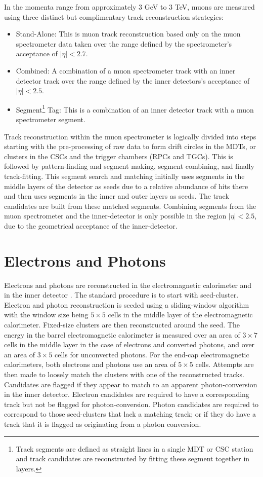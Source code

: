 In the momenta range from approximately 3 GeV to 3 TeV, muons are measured using three distinct but complimentary track reconstruction strategies:
\begin{itemize}
\item Stand-Alone: This is muon track reconstruction based only on the muon spectrometer data taken over the range defined by the spectrometer's acceptance of $| \eta | < 2.7$.
\item Combined: A combination of a muon spectrometer track with an inner detector track over the range defined by the inner detectors's acceptance of $ | \eta | < 2.5 $.
\item Segment\footnote{Track segments are defined as straight lines in a single MDT or CSC station and track candidates are reconstructed by fitting these segment together in layers.} Tag: This is a combination of an inner detector track with a muon spectrometer segment.
\end{itemize}
Track reconstruction within the muon spectrometer is logically divided into steps starting with the pre-processing of raw data to form drift circles in the MDTs, or clusters in the CSCs and the trigger chambers (RPCs and TGCs). This is followed by pattern-finding and segment making, segment combining, and finally track-fitting. This segment search and matching initially uses segments in the middle layers of the detector as seeds due to a relative abundance of hits there and then uses segments in the inner and outer layers as seeds. The track candidates are built from these matched segments. Combining segments from the muon spectrometer and the inner-detector is only possible in the region $|\eta | <2.5$, due to the geometrical acceptance of the inner-detector.
\section{Electrons and Photons}
Electrons and photons are reconstructed in the electromagnetic calorimeter and in the inner detector \cite{ATLAS}. The standard procedure is to start with seed-cluster. Electron and photon reconstruction is seeded using a sliding-window algorithm with the window size being $5 \times 5$ cells in the middle layer of the electromagnetic calorimeter. Fixed-size clusters are then reconstructed around the seed. The energy in the barrel electromagnetic calorimeter is measured over an area of $3 \times 7$ cells in the middle layer in the case of electrons and converted photons, and over an area of $3 \times 5$ cells for unconverted photons. For the end-cap electromagnetic calorimeters, both electrons and photons use an area of $5 \times 5$ cells. Attempts are then made to loosely match the clusters with one of the reconstructed tracks. Candidates are flagged if they appear to match to an apparent photon-conversion in the inner detector. Electron candidates are required to have a corresponding track but not be flagged for photon-conversion. Photon candidates are required to correspond to those seed-clusters that lack a matching track; or if they do have a track that it is flagged as originating from a photon conversion.
